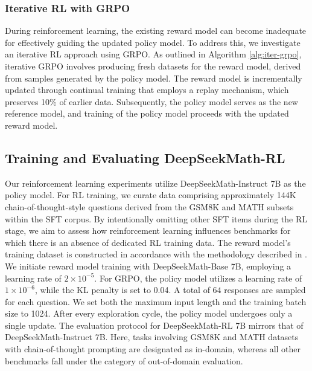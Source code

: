 \begin{itemize}[topsep=0pt]
\begin{itemize}[topsep=0pt]
\subsubsection{Iterative RL with GRPO} During reinforcement learning, the existing reward model can become inadequate for effectively guiding the updated policy model. To address this, we investigate an iterative RL approach using GRPO. As outlined in Algorithm \ref{alg:iter-grpo}, iterative GRPO involves producing fresh datasets for the reward model, derived from samples generated by the policy model. The reward model is incrementally updated through continual training that employs a replay mechanism, which preserves 10\% of earlier data. Subsequently, the policy model serves as the new reference model, and training of the policy model proceeds with the updated reward model.

\subsection{Training and Evaluating DeepSeekMath-RL}

Our reinforcement learning experiments utilize DeepSeekMath-Instruct 7B as the policy model. For RL training, we curate data comprising approximately 144K chain-of-thought-style questions derived from the GSM8K and MATH subsets within the SFT corpus. By intentionally omitting other SFT items during the RL stage, we aim to assess how reinforcement learning influences benchmarks for which there is an absence of dedicated RL training data. The reward model's training dataset is constructed in accordance with the methodology described in \citep{wang2023math}. We initiate reward model training with DeepSeekMath-Base 7B, employing a learning rate of $2 \times 10^{-5}$. For GRPO, the policy model utilizes a learning rate of $1 \times 10^{-6}$, while the KL penalty is set to 0.04. A total of $64$ responses are sampled for each question. We set both the maximum input length and the training batch size to 1024. After every exploration cycle, the policy model undergoes only a single update. The evaluation protocol for DeepSeekMath-RL 7B mirrors that of DeepSeekMath-Instruct 7B. Here, tasks involving GSM8K and MATH datasets with chain-of-thought prompting are designated as in-domain, whereas all other benchmarks fall under the category of out-of-domain evaluation.


\end{itemize}
\end{itemize}
